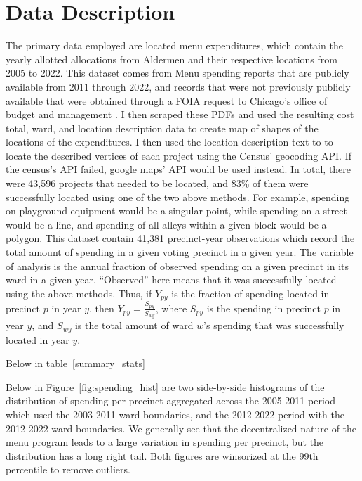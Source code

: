 \section{Data Description}\label{sec:data_description}
The primary data employed are located menu expenditures, which contain the yearly allotted allocations from Aldermen and their respective locations from 2005 to 2022.
This dataset comes from Menu spending reports that are publicly available from 2011 through 2022, and records that were not previously publicly available that were obtained through a FOIA request to Chicago's office of budget and management \cite{OBM_datasource}.  
I then scraped these PDFs and used the resulting cost total, ward, and location description data to create map of shapes of the locations of the expenditures.
I then used the location description text to to locate the described vertices of each project using the Census' geocoding API. 
If the census's API failed, google maps' API would be used instead.
In total, there were 43,596 projects that needed to be located, and 83\% of them were successfully located using one of the two above methods.
For example, spending on playground equipment would be a singular point, while spending on a street would be a line, and spending of all alleys within a given block would be a polygon.
This dataset contain 41,381 precinct-year observations which record the total amount of spending in a given voting precinct in a given year.
The variable of analysis is the annual fraction of observed spending on a given precinct in its ward in a given year.
``Observed'' here means that it was successfully located using the above methods.
Thus, if $Y_{py}$ is the fraction of spending located in precinct $p$ in year $y$, then $Y_{py} = \frac{S_{py}}{S_{wy}}$, where $S_{py}$ is the spending in precinct $p$ in year $y$, and $S_{wy}$ is the total amount of ward $w$'s spending that was successfully located in year $y$.

Below in table~\ref{summary_stats} 

Below in Figure~\ref{fig:spending_hist} are two side-by-side histograms of the distribution of spending per precinct aggregated across the 2005-2011 period which used the 2003-2011 ward boundaries, and the 2012-2022 period with the 2012-2022 ward boundaries.
We generally see that the decentralized nature of the menu program leads to a large variation in spending per precinct, but the distribution has a long right tail.
Both figures are winsorized at the 99th percentile to remove outliers.

